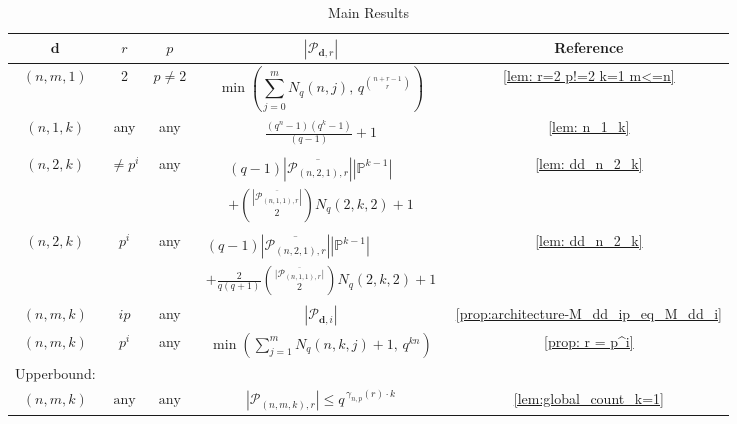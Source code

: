 \documentclass[a4paper]{cas-sc}
\newcommand{\dd}{\mathbf{d}}    %
\begin{document}
\begin{center}
\begin{table}[h!]
\label{architecture table}
\caption{Main Results} \vspace{1em}
    \renewcommand{\arraystretch}{1.7}
	\begin{tabular} {c|c|c|c|c} 

    \hline
        $\dd$ & $r$ & $p$ & $\left|\mathcal{P}_{\dd,r}\right|$ & Reference\\
    \hline 
        $(n,m,1)$ & 2 & $p \neq 2$ &
        \parbox[c]{0.45\textwidth}{
            \[
            \min\left(\sum_{j=0}^m N_q(n,j),\,q^{\binom{n+r-1}{r}}\right)
            \]
        }
        
        & \ref{lem: r=2 p!=2 k=1 m<=n} \\ 
        \hline 
        $(n,1,k)$ & any & 
        any & \parbox[c]{0.45\textwidth}{
        \begin{gather*}
        \frac{(q^n-1)(q^k-1)}{(q-1)} + 1
        \end{gather*} } & \ref{lem: n_1_k} \\ \hline 
        $(n,2,k)$ & 
        $\neq p^i$ & 
        any & \parbox[c]{0.45\textwidth}{
        \begin{gather*}
            (q-1)\left|\overline{\mathcal{P}_{(n,2,1), r}}\right| \left|\mathbb{P}^{k-1}\right| \\
            + \binom{\left|\overline{\mathcal{P}_{(n,1,1), r}}\right|}{2}N_{q}(2,k,2) + 1
        \end{gather*} 
        } & \ref{lem: dd_n_2_k}\\ \hline 
        $(n,2,k)$ & $p^i$ & any & 
        \parbox[c]{0.45\textwidth}{
        \begin{gather*} (q-1)\left | \overline{\mathcal{P}_{(n,2,1), r}} \right | \left|\mathbb{P}^{k-1}\right| \\
        + \frac{2}{q(q+1)} \binom{\lvert  \overline{\mathcal{P}_{(n,1,1), r}}\rvert }{2} N_{q}(2,k,2) + 1 \end{gather*} } & \ref{lem: dd_n_2_k}
        \\  \hline 
    $(n,m,k)$ & $ip$ & any & $\left|\mathcal{P}_{\dd,i}\right|$ & \ref{prop:architecture-M_dd_ip_eq_M_dd_i} \\ \hline
    $(n,m,k)$ & $p^i$ & any  & $ \min\left(\sum_{j=1}^m N_q(n,k,j) + 1,\, q^{kn}\right)$ & \ref{prop: r = p^i} 
    \\ \hline
Upperbound:
    \\ \hline
        $(n,m,k)$ & $\text{any}$ & $\text{any}$ & $ |\mathcal{P}_{(n,m,k),r}| \le q^{\,\gamma_{n,p}(r) \cdot k}$ & \ref{lem:global_count_k=1}  
\\ \hline
\end{tabular}
\end{table}
\end{center}
\end{document}
